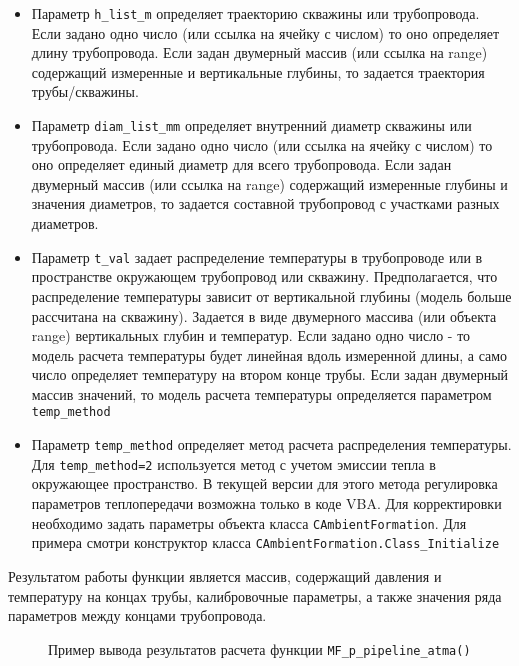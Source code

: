 \begin{itemize}
	\item Параметр 	\texttt{h_list_m} определяет траекторию скважины или трубопровода. Если задано одно число (или ссылка на ячейку с числом) то оно определяет длину трубопровода. Если задан двумерный массив (или ссылка на range) содержащий измеренные и вертикальные глубины, то задается траектория трубы/скважины. 
	\item Параметр 	\texttt{diam_list_mm} определяет внутренний диаметр скважины или трубопровода. Если задано одно число (или ссылка на ячейку с числом) то оно определяет единый диаметр для всего трубопровода. Если задан двумерный массив (или ссылка на range) содержащий измеренные глубины и значения диаметров, то задается составной трубопровод с участками разных диаметров. 
	\item Параметр \texttt{t_val} задает распределение температуры в трубопроводе или в пространстве окружающем трубопровод или скважину. Предполагается, что распределение температуры зависит от вертикальной глубины (модель больше рассчитана на скважину). Задается в виде двумерного массива (или объекта range) вертикальных глубин и температур. Если задано одно число - то модель расчета температуры будет линейная вдоль измеренной длины, а само число определяет температуру на втором конце трубы. Если задан двумерный массив значений, то модель расчета температуры определяется параметром \texttt{temp_method}
	\item Параметр \texttt{temp_method} определяет метод расчета распределения температуры. Для \texttt{temp_method=2} используется метод с учетом эмиссии тепла в окружающее пространство. В текущей версии \unf{} для этого метода регулировка параметров теплопередачи возможна только в коде VBA. Для корректировки необходимо задать параметры объекта класса  \texttt{CAmbientFormation}. Для примера смотри конструктор класса  \texttt{CAmbientFormation.Class_Initialize}
	
\end{itemize}



Результатом работы функции является массив, содержащий давления и температуру на концах трубы, калибровочные параметры, а также значения ряда параметров между концами трубопровода.

\begin{figure}[ht]
	\caption{Пример вывода результатов расчета функции \texttt{MF_p_pipeline_atma()}}
	\label{ris:pipeline_out_example}
\end{figure}


\newpage

